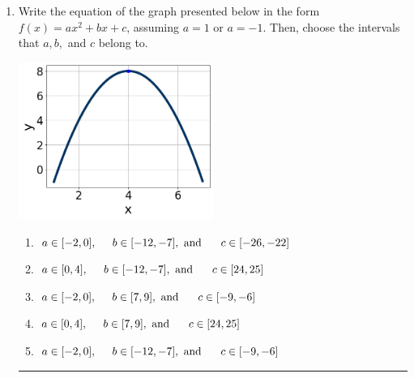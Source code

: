 \documentclass[14pt]{extbook}
\newcommand{\litem}[1]{\item#1\hspace*{-1cm}\rule{\textwidth}{0.4pt}}
\begin{document}
\begin{enumerate}
{\begin{enumerate}[label=\Alph*.]
\end{enumerate} }
\litem{
Write the equation of the graph presented below in the form $f(x)=ax^2+bx+c$, assuming  $a=1$ or $a=-1$. Then, choose the intervals that $a, b,$ and $c$ belong to.
\begin{center}
    \includegraphics[width=0.5\textwidth]{../Figures/quadraticGraphToEquationC.png}
\end{center}
\begin{enumerate}[label=\Alph*.]
\item \( a \in [-2, 0], \hspace*{5mm} b \in [-12, -7], \text{ and } \hspace*{5mm} c \in [-26, -22] \)
\item \( a \in [0, 4], \hspace*{5mm} b \in [-12, -7], \text{ and } \hspace*{5mm} c \in [24, 25] \)
\item \( a \in [-2, 0], \hspace*{5mm} b \in [7, 9], \text{ and } \hspace*{5mm} c \in [-9, -6] \)
\item \( a \in [0, 4], \hspace*{5mm} b \in [7, 9], \text{ and } \hspace*{5mm} c \in [24, 25] \)
\item \( a \in [-2, 0], \hspace*{5mm} b \in [-12, -7], \text{ and } \hspace*{5mm} c \in [-9, -6] \)


\end{enumerate}}
\end{enumerate}
\end{document}
